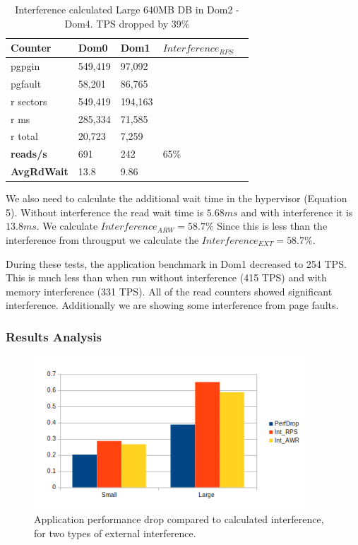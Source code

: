 \begin{table}[h]
\begin{tabular}{ l l l l p{5cm} }
  Counter     & Dom0    & Dom1    & $Interference_{RPS}$ \\
  \hline
	pgpgin    & 549,419 & 97,092 &  \\
	pgfault   &  58,201 & 86,765 &  \\
	r sectors & 549,419 &194,163 &  \\
	r ms      & 285,334 & 71,585 &  \\
	r total   &  20,723 &  7,259 &  \\
    \textbf{reads/s}    & 691 & 242 &   65\% \\
    \textbf{AvgRdWait}  & 13.8 & 9.86 &  \\ 
  \hline
\end{tabular}
\caption{Interference calculated Large 640MB DB in Dom2 - Dom4.  TPS dropped by 39\%}
\label{fig:InterferenceLg}
\end{table}
We also need to calculate the additional wait time in the hypervisor (Equation 5).  Without interference the read wait time is $5.68 ms$ and with interference it is $13.8 ms$.  We calculate $Interference_{ARW} = 58.7\%$  Since this is less than the interference from througput we calculate the $Interference_{EXT} = 58.7\%$.

During these tests, the application benchmark in Dom1 decreased to 254 TPS.  This is much less than when run without interference (415 TPS) and with memory interference (331 TPS).  All of the read counters showed significant interference.  Additionally we are showing some interference from page faults.  

\subsubsection{Results Analysis}

\begin{figure}[!h]
  \begin{center}
  \includegraphics[width=4in]{images/IBM_PerfDrop_Int.png}
  \caption{Application performance drop compared to calculated interference, for two types of external interference.}
  \label{fig:perfDrop}
  \end{center}
\end{figure}

